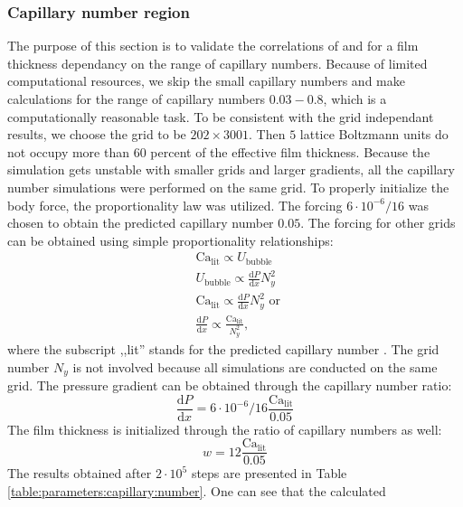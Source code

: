 \documentclass{CFD2011}
\newcommand{\Ca}{\mathrm{Ca}}
\begin{document}
\subsubsection{Capillary number region}
The purpose of this section is to validate the correlations of
\citet{giavedoni-numerical} and
\citet{heil-bretherton} for a film thickness dependancy on the range of capillary
numbers. Because of limited computational resources, we skip the
small capillary numbers and make calculations for the range of capillary numbers $0.03-0.8$, which
is a computationally reasonable task.  To be consistent with the grid independant results, we choose
the grid to be
$202 \times 3001$. Then $5$ lattice Boltzmann units do not occupy more than $60$
percent of the effective film thickness. Because the simulation gets unstable with
smaller grids and larger gradients, all the capillary number simulations were
performed on the same grid. To properly initialize the body force, the
proportionality law was utilized. The forcing
$6 \cdot 10^{-6}/16$ was chosen to obtain the predicted capillary
number $0.05$. The forcing for other grids can be obtained using
simple proportionality relationships:
\begin{equation}
\begin{aligned}
&\Ca_{\mathrm{lit}} \propto U_{\mathrm{bubble}}\\
&U_{\mathrm{bubble}} \propto \frac{\mathrm{d}P}{\mathrm{d}x} N_y^2\\
&\Ca_{\mathrm{lit}} \propto \frac{\mathrm{d}P}{\mathrm{d} x} N_y^2 \text{ or }\\
&\frac{\mathrm{d}P}{\mathrm{d} x} \propto \frac{\Ca_{\mathrm{lit}}}{N_y^2},
\end{aligned}
\end{equation}
where the subscript ,,lit'' stands for the predicted capillary number
\cite{giavedoni-numerical,heil-bretherton}. The grid number $N_y$ is not
involved because all simulations are conducted on the same grid.
The pressure gradient can be obtained through the capillary number
ratio:
\begin{equation}
\frac{\mathrm{d}P}{\mathrm{d} x}=6 \cdot 10^{-6}/16 \frac{\Ca_{\mathrm{lit}}}{0.05}
\end{equation}
The film thickness is initialized through the ratio of capillary numbers as well:
\begin{equation*}
w=12 \frac{\Ca_{\mathrm{lit}}}{0.05}
\end{equation*}
The results obtained after $2\cdot10^5$ steps are presented in Table
\ref{table:parameters:capillary:number}. One can see that the calculated
\end{document}
